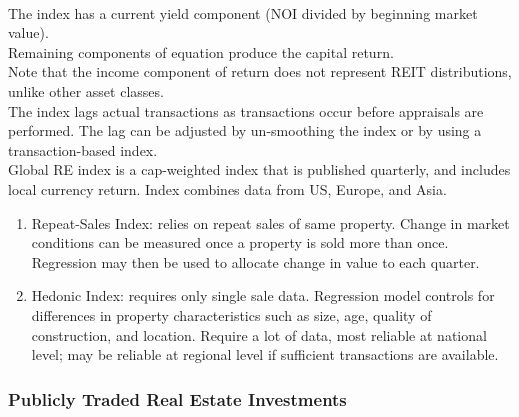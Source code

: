\begin{remark} \\
The index has a current yield component (NOI divided by beginning market value).\\
Remaining components of equation produce the capital return.\\
Note that the income component of return does not represent REIT distributions, unlike other asset classes.\\
The index lags actual transactions as transactions occur before appraisals are performed. The lag can be adjusted by un-smoothing the index or by using a transaction-based index.\\
Global RE index is a cap-weighted index that is published quarterly, and includes local currency return. Index combines data from US, Europe, and Asia.
\end{remark}

\begin{method} 
\begin{enumerate}[label=\roman*.]
\setlength{\itemsep}{0pt}
\item Repeat-Sales Index: relies on repeat sales of same property. Change in market conditions can be measured once a property is sold more than once.\\
Regression may then be used to allocate change in value to each quarter.
\item Hedonic Index: requires only single sale data. Regression model controls for differences in property characteristics such as size, age, quality of construction, and location. Require a lot of data, most reliable at national level; may be reliable at regional level if sufficient transactions are available.
\end{enumerate}
\end{method}

\subsubsection{Publicly Traded Real Estate Investments}

